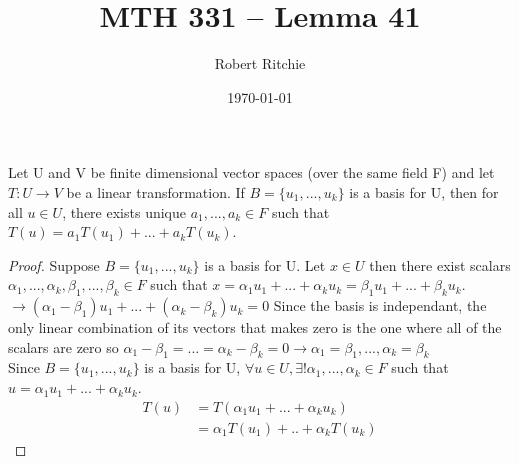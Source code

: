 \documentclass[11pt]{article}
\begin{document}
\author{Robert Ritchie}
\title{MTH 331 -- Lemma 41}
\date{\today}

\maketitle
Let U and V be finite dimensional vector spaces (over the same field F) and let $T : U \rightarrow V$ be a linear transformation. If $B = \{u_{1}, . . . , u_{k}\}$ is a basis for U, then for all $u \in U$, there exists unique $a_{1}, . . . , a_{k} \in F$ such that $T(u) = a_{1}T(u_{1}) + ... + a_{k}T(u_{k})$.

\begin{proof} 
Suppose $B = \{u_{1}, . . . , u_{k}\}$ is a basis for U.
Let $x \in U$ then there exist scalars $\alpha_{1},...,\alpha_{k},\beta_{1},...,\beta_{k} \in F$ such that $x=\alpha_{1}u_{1}+...+\alpha_{k}u_{k}=\beta_{1}u_{1}+...+\beta_{k}u_{k}$.
$\rightarrow (\alpha_{1}-\beta_{1})u_{1}+...+(\alpha_{k}-\beta_{k})u_{k}=0$ Since the basis is independant, the only linear combination of its vectors that makes zero is the one where all of the scalars are zero so $\alpha_{1}-\beta_{1}=...=\alpha_{k}-\beta_{k}=0 \rightarrow \alpha_{1}=\beta_{1},...,\alpha_{k}=\beta_{k}$ \\ 
Since  $B = \{u_{1}, . . . , u_{k}\}$ is a basis for U, $\forall u \in U, \exists !\alpha_{1},...,\alpha_{k}\in F$ such that $u=\alpha_{1}u_{1}+...+\alpha_{k}u_{k}$.
\begin{align*}
T(u)&=T(\alpha_{1}u_{1}+...+\alpha_{k}u_{k}) \\
&=\alpha_{1}T(u_{1})+..+\alpha_{k}T(u_{k})
\end{align*}

\end{proof}
\end{document}
